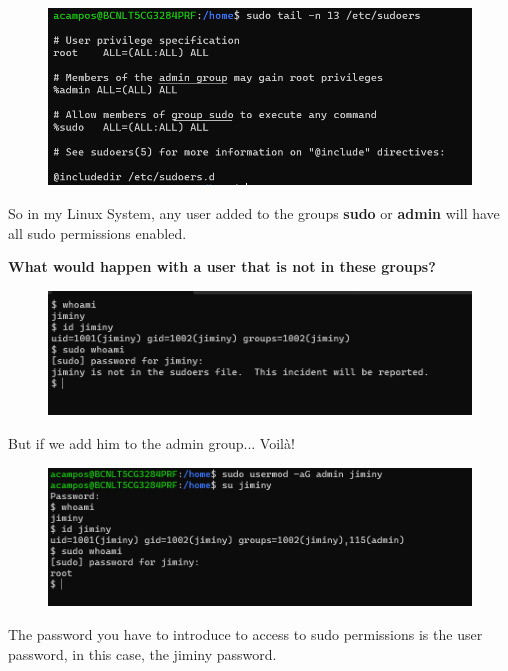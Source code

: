 \documentclass{article}
\newenvironment{blocktemplateII}[1]{%
    \tcolorbox[beamer,%
    noparskip,breakable,
    colframe=Green,%
    colbacklower=LimeGreen!75!LightGreen,%
    title=#1]}%
    {\endtcolorbox}
\begin{document}
\begin{figure}[H]
    \includegraphics[width=\textwidth]{pictures/sudoers.png}
    \centering
\end{figure}

So in my Linux System, any user added to the groups \textbf{sudo} or \textbf{admin} will have all sudo permissions enabled.

\textbf{What would happen with a user that is not in these groups?}
\begin{figure}[H]
    \includegraphics[width=\textwidth]{pictures/jiminy.png}
    \centering
\end{figure}

But if we add him to the admin group... Voilà!
\begin{figure}[H]
    \includegraphics[width=\textwidth]{pictures/voliajiminy.png}
    \centering
\end{figure}

\begin{blocktemplateII}{NOTE}
The password you have to introduce to access to sudo permissions is the user password, in this case, the jiminy password.
\end{blocktemplateII}
\end{document}

